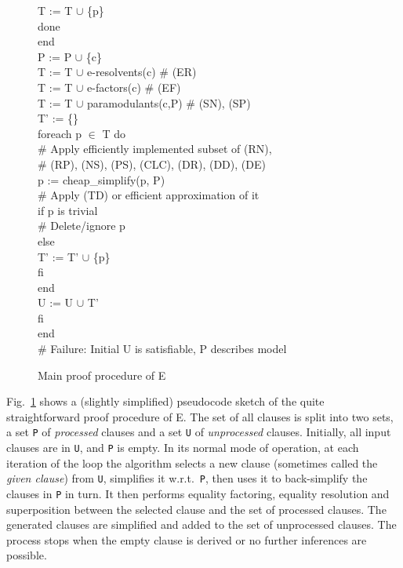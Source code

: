 \documentclass{report}
\begin{document}
\begin{figure}[hp]
\begin{center}
\begin{tabbing}
              T := T $\cup$ \{p\}\-\\
            done\-\\
          end\\
          P := P $\cup$ \{c\}\\
          T := T $\cup$ e-resolvents(c)    \# (ER)\\
          T := T $\cup$ e-factors(c)       \# (EF)\\
          T := T $\cup$ paramodulants(c,P) \# (SN), (SP)\\
          T' := \{\}\\
          foreach p $\in$ T do\+\\
            \# Apply efficiently implemented subset of (RN),\\
            \# (RP), (NS), (PS), (CLC), (DR), (DD), (DE)\\
            p := cheap\_simplify(p, P)\\
            \# Apply (TD) or efficient approximation of it\\
            if p is trivial\+\\
              \# Delete/ignore p\-\\
            else\+\\
               T' := T' $\cup$ \{p\}\-\\
            fi\-\\
          end\\
          U := U $\cup$ T' \-\\
        fi\-\\
      end\\
      \# Failure: Initial U is satisfiable, P describes model
    \end{tabbing}
    \normalfont
    \caption{Main proof procedure of E}
    \label{fig:procedure}
  \end{center}
\end{figure}

Fig.~\ref{fig:procedure} shows a (slightly simplified) pseudocode
sketch of the quite straightforward proof procedure of E. The set of
all clauses is split into two sets, a set \texttt{P} of
\emph{processed} clauses and a set \texttt{U} of \emph{unprocessed}
clauses. Initially, all input clauses are in \texttt{U}, and
\texttt{P} is empty. In its normal mode of operation, at each
iteration of the loop the algorithm selects a new clause (sometimes
called the \emph{given clause}) from \texttt{U},
simplifies it w.r.t.\ \texttt{P}, then uses it to back-simplify the
clauses in \texttt{P} in turn. It then performs equality factoring,
equality resolution and superposition between the selected clause and
the set of processed clauses. The generated clauses are simplified and
added to the set of unprocessed clauses. The process stops when the
empty clause is derived or no further inferences are possible.
\end{document}
